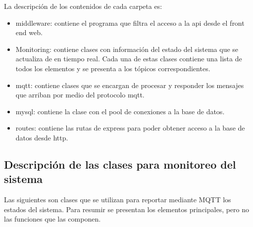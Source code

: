 La descripción de los contenidos de cada carpeta es:
\begin{itemize}
\item middleware: contiene el programa que filtra el acceso a la api desde el front end web.
\item Monitoring: contiene clases con información del estado del sistema que se actualiza de en tiempo real. Cada una de estas clases contiene una lista de todos los elementos y se presenta a los tópicos correspondientes.
\item mqtt: contiene clases que se encargan de procesar y responder los mensajes que arriban por medio del protocolo mqtt.
\item mysql: contiene la clase con el pool de conexiones a la base de datos.
\item routes: contiene las rutas de express para poder obtener acceso a la base de datos desde http.
\end{itemize}

\subsection{Descripción de las clases para monitoreo del sistema}

Las siguientes son clases que se utilizan para reportar mediante MQTT los estados del sistema. Para resumir se presentan los elementos principales, pero no las funciones que las componen.

